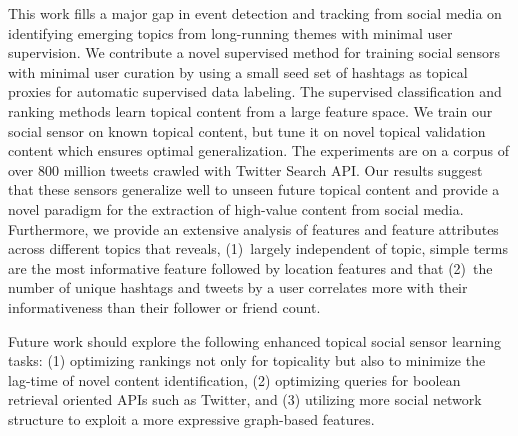 This work fills a major gap in 
event detection and tracking from social media
on identifying emerging topics from long-running themes with
minimal user supervision.  
We contribute a novel supervised method for training social sensors with minimal user curation by using a small seed set of hashtags as topical proxies for automatic supervised data labeling. The supervised classification and ranking methods learn topical content from a large feature space. We train our social sensor on known topical content, but tune it on novel topical validation content which ensures optimal generalization. The experiments are on a corpus of over $800$ million tweets crawled with Twitter Search API. Our results suggest that these
sensors generalize well to unseen future topical content and provide a
novel paradigm for the extraction of high-value content from social
media. Furthermore, we provide an
extensive analysis of features and feature attributes across different
topics that reveals, (1)~largely independent of
topic, simple terms are the most informative feature followed by
location features and that (2)~the number of unique hashtags and
tweets by a user correlates more with their informativeness than their follower or friend count.

Future work should explore the following enhanced topical
social sensor learning tasks: (1) optimizing rankings not only for topicality
but also to minimize the lag-time of novel content identification, (2) optimizing
queries for boolean retrieval oriented APIs such as Twitter, and (3) utilizing 
more social network structure to exploit a more expressive graph-based features.
